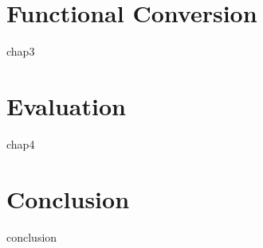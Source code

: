 \documentclass{book}
\begin{document}
\chapter{Functional Conversion}\label{chap:3}
\minitoc
{chap3}

\chapter{Evaluation}\label{chap:4}
\minitoc
{chap4}


\chapter{Conclusion}\label{chap:conclusion}
\minitoc
{conclusion}

\backmatter




\cleardoublepage
{}
{}


 

\end{document}
